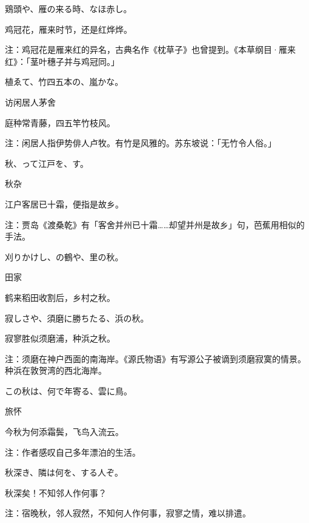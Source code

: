 \begin{haiku}
    {\FH 鶏頭や、雁の来る時、なほ赤し。}

    {\FK 鸡冠花，雁来时节，还是红烨烨。}

    {\FT 注：鸡冠花是雁来红的异名，古典名作《枕草子》也曾提到。《本草纲目·雁来红》：「茎叶穗子并与鸡冠同。」}
\end{haiku}

\begin{haiku}
    {\FH {}植ゑて、竹四五本の、嵐かな。}

    {\FK 访闲居人茅舍}

    {\FK 庭种常青藤，四五竿竹枝风。}

    {\FT 注：闲居人指伊势俳人卢牧。有竹是风雅的。苏东坡说：「无竹令人俗。」}
\end{haiku}

\begin{haiku}
    {\FH 秋、って江戸を、す。}

    {\FK 秋杂}

    {\FK 江户客居已十霜，便指是故乡。}

    {\FT 注：贾岛《渡桑乾》有「客舍并州已十霜……却望并州是故乡」句，芭蕉用相似的手法。}
\end{haiku}

\begin{haiku}
    {\FH 刈りかけし、の鶴や、里の秋。}

    {\FK 田家}

    {\FK 鹤来稻田收割后，乡村之秋。}
\end{haiku}

\begin{haiku}
    {\FH 寂しさや、須磨に勝ちたる、浜の秋。}

    {\FK 寂寥胜似须磨浦，种浜之秋。}

    {\FT 注：须磨在神户西面的南海岸。《源氏物语》有写源公子被谪到须磨寂寞的情景。种浜在敦贺湾的西北海岸。}
\end{haiku}

\begin{haiku}
    {\FH この秋は、何で年寄る、雲に鳥。}

    {\FK 旅怀}

    {\FK 今秋为何添霜鬓，飞鸟入流云。}

    {\FT 注：作者感叹自己多年漂泊的生活。}
\end{haiku}

\begin{haiku}
    {\FH 秋深き、隣は何を、する人ぞ。}

    {\FK 秋深矣！不知邻人作何事？}

    {\FT 注：宿晚秋，邻人寂然，不知何人作何事，寂寥之情，难以排遣。}
\end{haiku}

